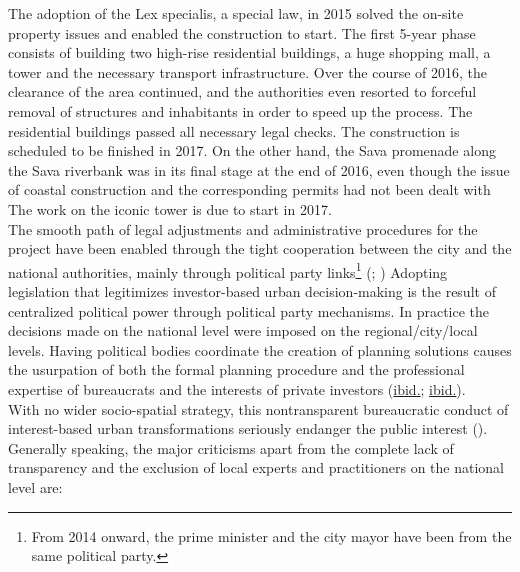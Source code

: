\documentclass[11pt]{report}
\begin{document}
{{{{\begin{itemize}
The adoption of the Lex specialis, a special law, in 2015 solved the on-site property issues and enabled the construction to start. The first 5-year phase consists of building two high-rise residential buildings, a huge shopping mall, a tower and the necessary transport infrastructure. Over the course of 2016, the clearance of the area continued, and the authorities even resorted to forceful removal of structures and inhabitants in order to speed up the process. The residential buildings passed all necessary legal checks. The construction is scheduled to be finished in 2017. On the other hand, the Sava promenade along the Sava riverbank was in its final stage at the end of 2016, even though the issue of coastal construction and the corresponding permits had not been dealt with 
The work on the iconic tower is due to start in 2017.
\\

The smooth path of legal adjustments and administrative procedures for the project have been enabled through the tight cooperation between the city and the national authorities, mainly through political party links\footnote{From 2014 onward, the prime minister and the city mayor have been from the same political party.}
(\href{Maruna}{\citealt{maruna_can_2015}}; \href{Peric}{\citealt{peric_evolution_2016}})
Adopting legislation that legitimizes investor-based urban decision-making is the result of centralized political power through political party mechanisms. In practice the decisions made on the national level were imposed on the regional/city/local levels. Having political bodies coordinate the creation of planning solutions causes the usurpation of both the formal planning procedure and the professional expertise of bureaucrats and the interests of private investors (\href{Maruna}{ibid.}; \href{Peric}{ibid.}).
\\

With no wider socio-spatial strategy, this nontransparent bureaucratic conduct of interest-based urban transformations seriously endanger the public interest (\href{Vukmirovic}{\citealt{doytchinov_belgrade:_2015}}). 
Generally speaking, the major criticisms apart from the complete lack of transparency and the exclusion of local experts and practitioners on the national level are:


\end{itemize}}}}}
\end{document}
